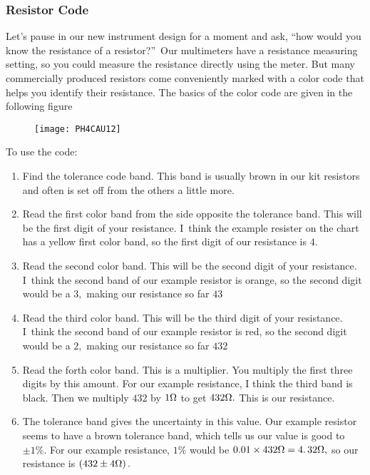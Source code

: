 \subsubsection{Resistor Code}

Let's pause in our new instrument design for a moment and ask,
\textquotedblleft how would you know the resistance of a
resistor?\textquotedblright\ Our multimeters have a resistance measuring
setting, so you could measure the resistance directly using the meter. But
many commercially produced resistors come conveniently marked with a color
code that helps you identify their resistance. The basics of the color code
are given in the following figure\bigskip 

\begin{figure}[h!]
	\centering
    \texttt{[image: PH4CAU12]}
\end{figure}

To use the code:

\begin{enumerate}
\item Find the tolerance code band. This band is usually brown in our kit
resistors and often is set off from the others a little more.

\item Read the first color band from the side opposite the tolerance band.
This will be the first digit of your resistance. I\ think the example
resister on the chart has a yellow first color band, so the first digit of
our resistance is $4.$

\item Read the second color band. This will be the second digit of your
resistance. I\ think the second band of our example resistor is orange, so
the second digit would be a $3,$ making our resistance so far $43$

\item Read the third color band. This will be the third digit of your
resistance. I\ think the second band of our example resistor is red, so the
second digit would be a $2,$ making our resistance so far $432$

\item Read the forth color band. This is a multiplier. You multiply the
first three digits by this amount. For our example resistance, I think the
third band is black. Then we multiply $432$ by $1\unit{%
\Omega%
}$ to get $432\unit{%
\Omega%
}.$ This is our resistance.

\item The tolerance band gives the uncertainty in this value. Our example
resistor seems to have a brown tolerance band, which tells us our value is
good to $\pm 1\%.$ For our example resistance, $1\%$ would be $0.01\times 432%
\unit{%
\Omega%
}=\allowbreak 4.\,\allowbreak 32\unit{%
\Omega%
},$ so our resistance is $\left( 432\pm 4\unit{%
\Omega%
}\right) .$
\end{enumerate}

